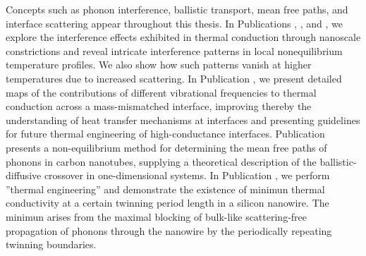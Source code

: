 Concepts such as phonon interference, ballistic transport, mean free paths, and interface scattering appear throughout this thesis. In Publications , , and , we explore the interference effects exhibited in thermal conduction through nanoscale constrictions and reveal intricate interference patterns in local nonequilibrium temperature profiles. We also show how such patterns vanish at higher temperatures due to increased scattering. In Publication , we present detailed maps of the contributions of different vibrational frequencies to thermal conduction across a mass-mismatched interface, improving thereby the understanding of heat transfer mechanisms at interfaces and presenting guidelines for future thermal engineering of high-conductance interfaces. Publication  presents a non-equilibrium method for determining the mean free paths of phonons in carbon nanotubes, supplying a theoretical description of the ballistic-diffusive crossover in one-dimensional systems. In Publication , we perform ''thermal engineering'' and demonstrate the existence of minimun thermal conductivity at a certain twinning period length in a silicon nanowire. The minimun arises from the maximal blocking of bulk-like scattering-free propagation of phonons through the nanowire by the periodically repeating twinning boundaries.








